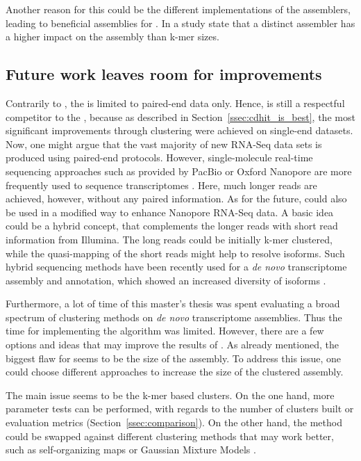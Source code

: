 \documentclass[12pt,a4paper,english]{article}
\begin{document}
		Another reason for this could be the different implementations of the assemblers, leading to beneficial assemblies for \soap. In a study \citeauthor{Rana:16} state that a distinct assembler has a higher impact on the assembly than k-mer sizes. \citep{Rana:16}
	
	\subsection{Future work leaves room for improvements}
	Contrarily to \karma, the \orp is limited to paired-end data only.
	Hence, \karma is still a respectful competitor to the \orp, because as described in Section~\ref{ssec:cdhit_is_best}, the most significant improvements through clustering were achieved on single-end datasets. Now, one might argue that the vast majority of new RNA-Seq data sets is produced using paired-end protocols. However, single-molecule real-time sequencing approaches such as provided by PacBio \citep{smrt:pacbio:09} or Oxford Nanopore \citep{smrt:ont:16} are more frequently used to sequence transcriptomes \citep{smrt:17}. Here, much longer reads are achieved, however, without any paired information.
	As for the future, \karma could also be used in a modified way to enhance Nanopore RNA-Seq data. 
	A basic idea could be a hybrid concept, that complements the longer reads with short read information from Illumina. The long reads could be initially k-mer clustered, while the quasi-mapping of the short reads might help to resolve isoforms. Such hybrid sequencing methods have been recently used for a \textit{de novo} transcriptome assembly and annotation, which showed an increased diversity of isoforms \citep{idp:18}.	
	 
	Furthermore, a lot of time of this master's thesis was spent evaluating a broad spectrum of clustering methods on \textit{de novo} transcriptome assemblies. Thus the time for implementing the algorithm was limited.
	However, there are a few options and ideas that may improve the results of \karma.
	As already mentioned, the biggest flaw for \karma seems to be the size of the assembly.
	To address this issue, one could choose different approaches to increase the size of the clustered assembly.
	
	The main issue seems to be the k-mer based clusters. On the one hand, more parameter tests can be performed, with regards to the number of clusters built or evaluation metrics (Section~\ref{ssec:comparison}). On the other hand, the method could be swapped against different clustering methods that may work better, such as self-organizing maps \citep{gene_clustering:19} or Gaussian Mixture Models \citep{gene_clustering:16}.
	
\end{document}
